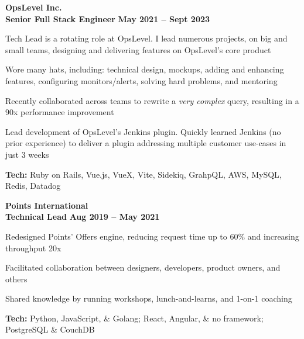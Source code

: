 \documentclass[margin,line]{resume}
\begin{document}
\begin{resume}
    \hspace{-3mm}\textbf{\listing OpsLevel Inc.} \vspace{3mm}\\\vspace{1mm}
    \hspace{1.2mm}\textbf{Senior Full Stack Engineer} \hfill \textbf{May 2021 -- Sept 2023}\vspace{1mm}
    \begin{list2}
        \item Tech Lead is a rotating role at OpsLevel. I lead numerous projects, on big and small teams, designing and delivering features on OpsLevel's core product
        \vspace{1mm}
        \item Wore many hats, including: technical design, mockups, adding and enhancing features, configuring monitors/alerts, solving hard problems, and mentoring
        \vspace{1mm}
        \item Recently collaborated across teams to rewrite a \textit{very complex} query, resulting in a 90x performance improvement
        \vspace{1mm}
        \item Lead development of OpsLevel's Jenkins plugin. Quickly learned Jenkins (no prior experience) to deliver a plugin addressing multiple customer use-cases in just 3 weeks
        \vspace{1mm}
        \item\textbf{Tech:} Ruby on Rails, Vue.js, VueX, Vite, Sidekiq, GrahpQL, AWS, MySQL, Redis, Datadog
    \end{list2}

    \hspace{-3mm}\textbf{\listing Points International} \vspace{2mm}\\\vspace{1mm}
    \hspace{1.2mm}\textbf{Technical Lead} \hfill \textbf{Aug 2019 -- May 2021}\vspace{1mm}
    \begin{list2}
        \item Redesigned Points’ Offers engine, reducing request time up to 60\% and increasing throughput 20x
        \vspace{1mm}
        \item Facilitated collaboration between designers, developers, product owners, and others
        \vspace{1mm}
        \item Shared knowledge by running workshops, lunch-and-learns, and 1-on-1 coaching
        \vspace{1mm}
        \item\textbf{Tech:} Python, JavaScript, \& Golang; React, Angular, \& no framework; PostgreSQL \& CouchDB
    \end{list2}


\end{resume}
\end{document}
